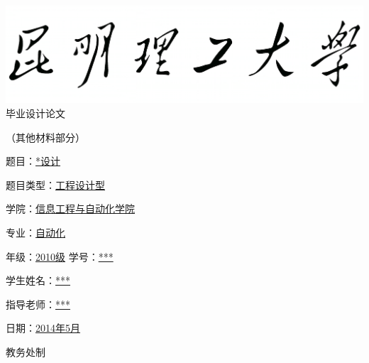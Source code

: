 \documentclass[12pt,a4paper]{article}
\begin{document}
\begin{titlepage}
{
\begin{center}
{
\includegraphics[scale=0.18]{1.png}\\
}
\vspace{10pt}
{
\hei
\fontsize{44pt}{55pt}\selectfont
毕\thickspace 业\thickspace 设\thickspace 计\thickspace 论\thickspace 文\\[15mm]

}
\end{center}
}
{
\begin{center}
\huawen
\fontsize{20pt}{30pt}\selectfont
（其\thickspace 他\thickspace 材\thickspace 料\thickspace 部\thickspace 分）\\[30mm]
\end{center}
}

{
\songti

\fontsize{15pt}{18pt}\selectfont
{}\baselineskip
 题\qquad 目：\uline{\hfill **设计\hfill}\hspace{15mm} \par
 题目类型：\uline{\hfill 工程设计型\hfill}\hspace{15mm} \par
 学\qquad 院：\uline{\hfill 信息工程与自动化学院\hfill}\hspace{15mm} \par
 专\qquad 业：\uline{\hfill 自动化\hfill}\hspace{15mm} \par
 年\qquad 级：\uline{\hfill 2010级\hfill} 学\quad 号：\uline{\hfill ****\hfill}\hspace{15mm} \par
 学生姓名：\uline{\hfill **** \hfill}\hspace{15mm} \par
 指导老师：\uline{\hfill **** \hfill}\hspace{15mm} \par
 日\qquad 期：\uline{\hfill 2014年5月\hfill}\hspace{15mm} \par
}
 \vspace{13mm}
{

\songti
\begin{center}
\fontsize{15pt}{18pt}\selectfont
教\quad 务\quad 处\quad 制
\end{center}
}
\end{titlepage}
\end{document}

